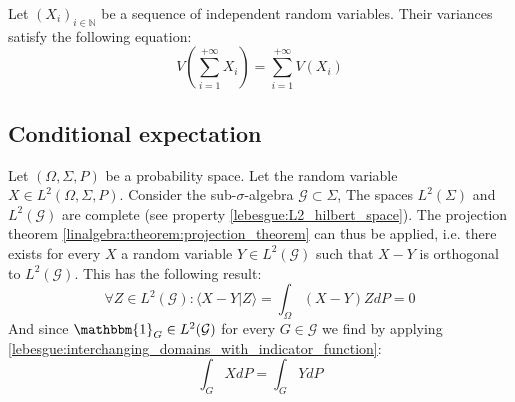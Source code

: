     
    \begin{property}
		Let $(X_i)_{i\in\mathbb{N}}$ be a sequence of independent random variables. Their variances satisfy the following equation:
        \begin{equation}
			\label{prop:variance_of_sum}
            V\left(\sum_{i=1}^{+\infty}X_i\right) = \sum_{i=1}^{+\infty}V(X_i)
		\end{equation}
	\end{property}
    
\subsection{Conditional expectation}
	Let $(\Omega,\Sigma,P)$ be a probability space. Let the random variable $X\in L^2(\Omega,\Sigma,P)$\footnotemark. Consider the sub-$\sigma$-algebra $\mathcal{G}\subset\Sigma$, The spaces $L^2(\Sigma)$ and $L^2(\mathcal{G})$ are complete (see property \ref{lebesgue:L2_hilbert_space}). The projection theorem \ref{linalgebra:theorem:projection_theorem} can thus be applied, i.e. there exists for every $X$ a random variable $Y\in L^2(\mathcal{G})$ such that $X-Y$ is orthogonal to $L^2(\mathcal{G})$. This has the following result:
    \begin{equation}
		\forall Z\in L^2(\mathcal{G}):\langle X-Y|Z \rangle = \int_\Omega(X-Y)ZdP = 0
	\end{equation}
    And since $\mathbbm{1}_G\in L^2(\mathcal{G})$ for every $G\in\mathcal{G}$ we find by applying \ref{lebesgue:interchanging_domains_with_indicator_function}:
    \begin{equation}
    	\label{prop:conditional_expectation_condition}
		\int_G XdP = \int_G YdP
	\end{equation}
    
